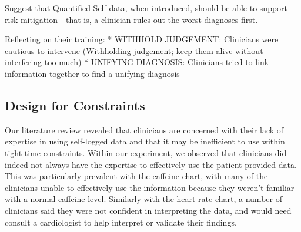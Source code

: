 \documentclass{sigchi}
\begin{document}

Suggest that Quantified Self data, when introduced, should be able to support risk mitigation - that is, a clinician rules out the worst diagnoses first.


Reflecting on their training:
* WITHHOLD JUDGEMENT: Clinicians were cautious to intervene (Withholding judgement; keep them alive without interfering too much)
* UNIFYING DIAGNOSIS: Clinicians tried to link information together to find a unifying diagnosis







\subsection{Design for Constraints} %



Our literature review revealed that clinicians are concerned with their lack of expertise in using self-logged data and that it may be inefficient to use within tight time constraints. Within our experiment, we observed that clinicians did indeed not always have the expertise to effectively use the patient-provided data. This was particularly prevalent with the caffeine chart, with many of the clinicians unable to effectively use the information because they weren't familiar with a normal caffeine level. Similarly with the heart rate chart, a number of clinicians said they were not confident in interpreting the data, and would need consult a cardiologist to help interpret or validate their findings. %
\end{document}
